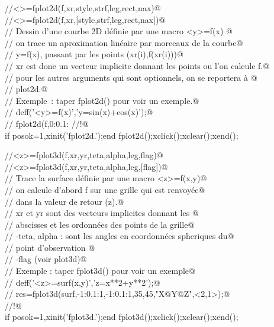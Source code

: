 
\verb@//<>=fplot2d(f,xr,style,strf,leg,rect,nax)@ \\
\verb@//<>=fplot2d(f,xr,[style,strf,leg,rect,nax])@ \\
\verb@// Dessin d'une courbe 2D d\'efinie par une macro <y>=f(x) @ \\
\verb@// on trace un aproximation lin\'eaire par morceaux de la courbe@ \\
\verb@// y=f(x), passant par les points (xr(i),f(xr(i)))@ \\
\verb@// xr est donc un vecteur implicite donnant les points ou l'on calcule f.@ \\
\verb@// pour les autres arguments qui sont optionnels, on se reportera \`a @ \\
\verb@// plot2d.@ \\
\verb@// Exemple~: taper fplot2d() pour voir un exemple.@ \\
\verb@// deff('<y>=f(x)','y=sin(x)+cos(x)');@ \\
\verb@// fplot2d(f,0:0.1:%pi);@ \\
\verb@//!@ \\
if posok=1,xinit('fplot2d.');end
fplot2d();xclick();xclear();xend();


\verb@//<z>=fplot3d(f,xr,yr,teta,alpha,leg,flag)@ \\
\verb@//<z>=fplot3d(f,xr,yr,teta,alpha,leg,[flag])@ \\
\verb@// Trace la surface d\'efinie par une macro <z>=f(x,y)@ \\
\verb@// on calcule d'abord f sur une grille qui est renvoy\'ee@ \\
\verb@// dans la valeur de retour (z).@ \\
\verb@// xr et yr sont des vecteurs implicites donnant les @ \\
\verb@// abscisses et les ordonn\'ees des points de la grille@ \\
\verb@// -teta, alpha : sont les angles en coordonn\'ees spheriques du@ \\
\verb@//      point d'observation @ \\
\verb@// -flag (voir plot3d)@ \\
\verb@// Exemple : taper fplot3d() pour voir un exemple@ \\
\verb@// deff('<z>=surf(x,y)','z=x**2+y**2');@ \\
\verb@// res=fplot3d(surf,-1:0.1:1,-1:0.1:1,35,45,"X@Y@Z",<2,1>);@ \\
\verb@//!@ \\
if posok=1,xinit('fplot3d.');end
fplot3d();xclick();xclear();xend();


